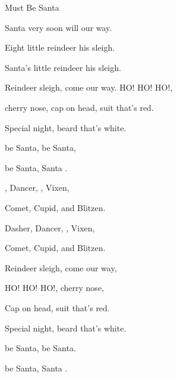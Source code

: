 \begin{SBSong}{Must Be Santa}
\begin{SBVerse}
    Santa very soon will  our way.
	
    Eight little reindeer  his sleigh.
	
    Santa's little reindeer  his sleigh.
	
    Reindeer sleigh, come our way. HO! HO! HO!,
	
    cherry nose, cap on head, suit that's red.
	
    Special night, beard that's white.
	
     be Santa,  be Santa,
	
     be Santa, Santa . 
  \end{SBVerse}
  \begin{SBVerse}	
	, Dancer, , Vixen,
	
    Comet, Cupid,  and Blitzen.

    Dasher, Dancer, , Vixen,
	
    Comet, Cupid,  and Blitzen.
	
    Reindeer sleigh, come our way,
	
    HO! HO! HO!, cherry nose,
	
    Cap on head, suit that's red.
	
    Special night, beard that's white.
	
     be Santa,  be Santa.
	
     be Santa, Santa .
  \end{SBVerse}
 \end{SBSong}
